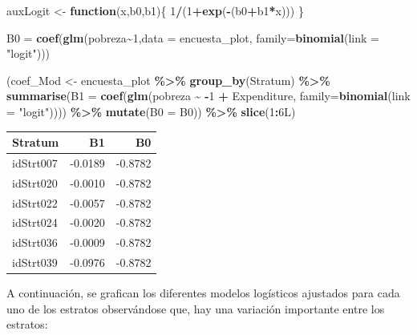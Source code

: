 \documentclass[
  12pt,
]{book}
\newenvironment{Shaded}{\begin{snugshade}}{\end{snugshade}}
\newcommand{\AttributeTok}[1]{\textcolor[rgb]{0.13,0.29,0.53}{#1}}
\newcommand{\ControlFlowTok}[1]{\textcolor[rgb]{0.13,0.29,0.53}{\textbf{#1}}}
\newcommand{\DataTypeTok}[1]{\textcolor[rgb]{0.13,0.29,0.53}{#1}}
\newcommand{\DecValTok}[1]{\textcolor[rgb]{0.00,0.00,0.81}{#1}}
\newcommand{\FunctionTok}[1]{\textcolor[rgb]{0.13,0.29,0.53}{\textbf{#1}}}
\newcommand{\NormalTok}[1]{#1}
\newcommand{\OtherTok}[1]{\textcolor[rgb]{0.56,0.35,0.01}{#1}}
\newcommand{\SpecialCharTok}[1]{\textcolor[rgb]{0.81,0.36,0.00}{\textbf{#1}}}
\newcommand{\StringTok}[1]{\textcolor[rgb]{0.31,0.60,0.02}{#1}}
\begin{document}
\begin{Shaded}
\begin{Highlighting}[]
\NormalTok{auxLogit }\OtherTok{\textless{}{-}} \ControlFlowTok{function}\NormalTok{(x,b0,b1)\{}
  \DecValTok{1}\SpecialCharTok{/}\NormalTok{(}\DecValTok{1}\SpecialCharTok{+}\FunctionTok{exp}\NormalTok{(}\SpecialCharTok{{-}}\NormalTok{(b0}\SpecialCharTok{+}\NormalTok{b1}\SpecialCharTok{*}\NormalTok{x)))}
\NormalTok{\}}

\NormalTok{B0 }\OtherTok{=} \FunctionTok{coef}\NormalTok{(}\FunctionTok{glm}\NormalTok{(pobreza}\SpecialCharTok{\textasciitilde{}}\DecValTok{1}\NormalTok{,}\AttributeTok{data =}\NormalTok{ encuesta\_plot,}
     \AttributeTok{family=}\FunctionTok{binomial}\NormalTok{(}\AttributeTok{link =} \StringTok{"logit"}\NormalTok{)))}

\NormalTok{(coef\_Mod }\OtherTok{\textless{}{-}}\NormalTok{ encuesta\_plot }\SpecialCharTok{\%\textgreater{}\%} \FunctionTok{group\_by}\NormalTok{(Stratum) }\SpecialCharTok{\%\textgreater{}\%} 
  \FunctionTok{summarise}\NormalTok{(}\AttributeTok{B1 =} \FunctionTok{coef}\NormalTok{(}\FunctionTok{glm}\NormalTok{(pobreza }\SpecialCharTok{\textasciitilde{}}  \SpecialCharTok{{-}}\DecValTok{1} \SpecialCharTok{+}\NormalTok{ Expenditure,}
              \AttributeTok{family=}\FunctionTok{binomial}\NormalTok{(}\AttributeTok{link =} \StringTok{"logit"}\NormalTok{)))) }\SpecialCharTok{\%\textgreater{}\%} 
\FunctionTok{mutate}\NormalTok{(}\AttributeTok{B0 =}\NormalTok{ B0)) }\SpecialCharTok{\%\textgreater{}\%} \FunctionTok{slice}\NormalTok{(}\DecValTok{1}\SpecialCharTok{:}\DecValTok{6}\DataTypeTok{L}\NormalTok{)}
\end{Highlighting}
\end{Shaded}

\begin{tabular}{l|r|r}
\hline
Stratum & B1 & B0\\
\hline
idStrt007 & -0.0189 & -0.8782\\
\hline
idStrt020 & -0.0010 & -0.8782\\
\hline
idStrt022 & -0.0057 & -0.8782\\
\hline
idStrt024 & -0.0020 & -0.8782\\
\hline
idStrt036 & -0.0009 & -0.8782\\
\hline
idStrt039 & -0.0976 & -0.8782\\
\hline
\end{tabular}

A continuación, se grafican los diferentes modelos logísticos ajustados para cada uno de los estratos observándose que, hay una variación importante entre los estratos:
\end{document}
